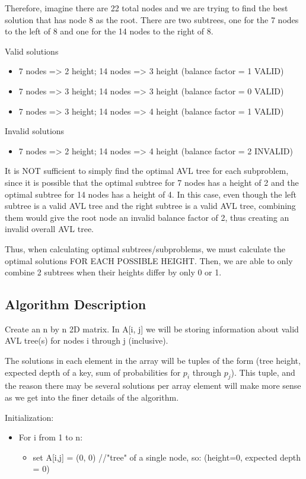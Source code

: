 \documentclass[a4paper]{article}
\begin{document}
Therefore, imagine there are 22 total nodes and we are trying to find the best solution that has node 8 as the root. There are two subtrees, one for the 7 nodes to the left of 8 and one for the 14 nodes to the right of 8.

Valid solutions
\begin{itemize}
    \item 7 nodes => 2 height; 14 nodes => 3 height (balance factor = 1 VALID)
    \item 7 nodes => 3 height; 14 nodes => 3 height (balance factor = 0 VALID)
    \item 7 nodes => 3 height; 14 nodes => 4 height (balance factor = 1 VALID)
\end{itemize}

Invalid solutions
\begin{itemize}
    \item 7 nodes => 2 height; 14 nodes => 4 height (balance factor = 2 INVALID)
\end{itemize}
It is NOT sufficient to simply find the optimal AVL tree for each subproblem, since it is possible that the optimal subtree for 7 nodes has a height of 2 and the optimal subtree for 14 nodes has a height of 4. In this case, even though the left subtree is a valid AVL tree and the right subtree is a valid AVL tree, combining them would give the root node an invalid balance factor of 2, thus creating an invalid overall AVL tree.

Thus, when calculating optimal subtrees/subproblems, we must calculate the optimal solutions FOR EACH POSSIBLE HEIGHT. Then, we are able to only combine 2 subtrees when their heights differ by only 0 or 1.

\subsection{Algorithm Description}

Create an n by n 2D matrix. In A[i, j] we will be storing information about valid AVL tree(s) for nodes i through j (inclusive).

The solutions in each element in the array will be tuples of the form 
(tree height, expected depth of a key, sum of probabilities for $p_i$ through $p_j$).
This tuple, and the reason there may be several solutions per array element will make more sense as we get into the finer details of the algorithm.


Initialization:
\begin{itemize}
\item For i from 1 to n:
    \begin{itemize}
    \item set A[i,j] = (0, 0) //"tree" of a single node, so: (height=0, expected depth = 0)
    \end{itemize}
\end{itemize}
\end{document}
